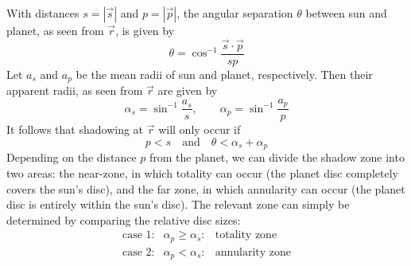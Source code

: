 \documentclass[a4paper]{article}
\begin{document}
With distances $s = |\vec{s}|$ and $p = |\vec{p}|$, the angular separation $\theta$ between sun and planet, as seen from $\vec{r}$, is given by
\begin{equation}
\theta = \cos^{-1} \frac{\vec{s} \cdot \vec{p}}{sp}
\end{equation}
Let $a_s$ and $a_p$ be the mean radii of sun and planet, respectively. Then their apparent radii, as seen from $\vec{r}$ are given by
\begin{equation}
\alpha_s = \sin^{-1} \frac{a_s}{s}, \qquad \alpha_p = \sin^{-1} \frac{a_p}{p}
\end{equation}
It follows that shadowing at $\vec{r}$ will only occur if
\begin{equation}
p < s \quad \text{and} \quad \theta < \alpha_s + \alpha_p
\end{equation}
Depending on the distance $p$ from the planet, we can divide the shadow zone into two areas: the near-zone, in which totality can occur (the planet disc completely covers the sun's disc), and the far zone, in which annularity can occur (the planet disc is entirely within the sun's disc).
The relevant zone can simply be determined by comparing the relative disc sizes:\begin{equation}\label{eq:shadowzone}
\begin{array}{lcl}
\text{case 1:} & \alpha_p \geq \alpha_s: & \text{totality zone}\\
\text{case 2:} & \alpha_p < \alpha_s: & \text{annularity zone}
\end{array}
\end{equation}
\end{document}

